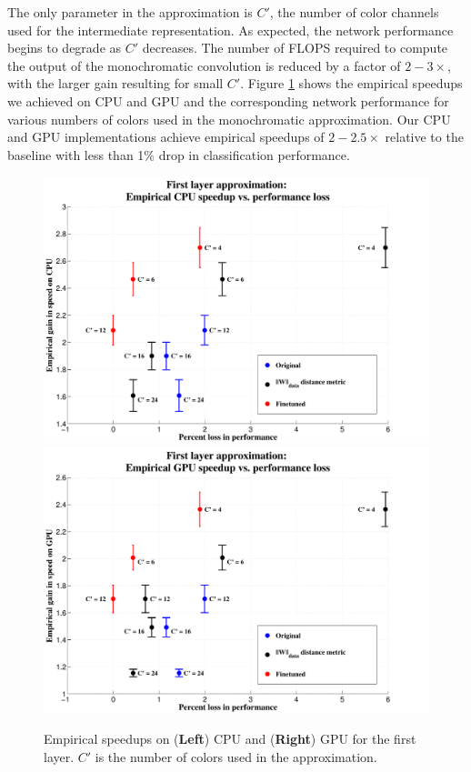 The only parameter in the approximation is $C'$, the number of color channels used for the intermediate representation. As expected, the network performance begins to degrade as $C'$ decreases. 
The number of FLOPS required to compute the output of the monochromatic convolution is reduced by a factor of $2-3\times$, with the larger gain resulting for small $C'$. 
Figure \ref{fig:mono_speedups} shows the empirical speedups we achieved on CPU and GPU and the corresponding network performance for various numbers of colors used in the monochromatic approximation.   
Our CPU and GPU implementations achieve empirical speedups of $2-2.5\times$ relative to the baseline with less than 1\% drop in classification performance. 

\begin{figure}[t]
\centering
\begin{minipage}{0.9\textwidth}
      \includegraphics[width=0.5\linewidth]{img/layer1_CPUspeedup_vs_performance_loss_finetune_and_orig.pdf}
	\quad
      \includegraphics[width=0.5\linewidth]{img/layer1_GPUspeedup_vs_performance_loss_finetune_and_orig.pdf}
\end{minipage}
\caption{Empirical speedups on ({\bf Left}) CPU and ({\bf Right}) GPU for the first layer. $C'$ is the number of colors used in the approximation.}
\label{fig:mono_speedups}
\end{figure}

